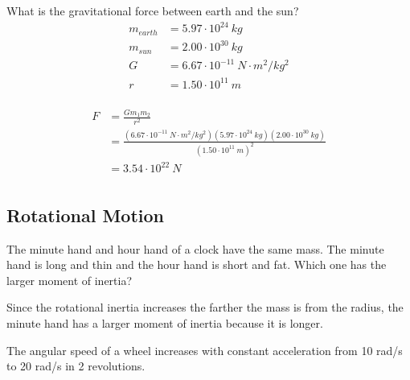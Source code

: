\documentclass[fleqn,addpoints]{exam}
\begin{document}
\begin{questions}
\question[3]
What is the gravitational force between earth and the sun?
\begin{align*}
  m_{earth} &= 5.97 \cdot 10^{24} \ kg \\
  m_{sun} &= 2.00 \cdot 10^{30} \ kg \\
  G &= 6.67 \cdot 10^{-11} \ N \cdot m^2/kg^2 \\
  r &= 1.50 \cdot 10^{11} \ m \\
\end{align*}

\begin{solution}
\begin{align*}
  F &= \frac{Gm_1m_2}{r^2} \\
    &= \frac{(6.67 \cdot 10^{-11} \ N \cdot m^2/kg^2)(5.97 \cdot 10^{24} \ kg )(2.00 \cdot 10^{30} \ kg)}
            {(1.50 \cdot 10^{11} \ m)^2} \\
    &= 3.54 \cdot 10^{22} \ N \\
\end{align*}
\end{solution}
\subsection{Rotational Motion}

\question[2] The minute hand and hour hand of a clock have the same mass.  The
minute hand is long and thin and the hour hand is short and fat.  Which one has
the larger moment of inertia?

\begin{solution}
Since the rotational inertia increases the farther the mass is from the radius, the minute hand has a larger moment of
inertia because it is longer. 
\end{solution}

\question The angular speed of a wheel increases with constant acceleration
from 10 rad/s to 20 rad/s in 2 revolutions.

\end{questions}
\end{document}
